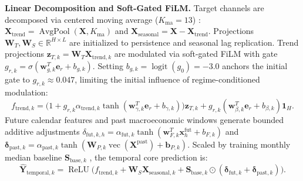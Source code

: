\documentclass[sigconf]{acmart}
\begin{document}
\textbf{Linear Decomposition and Soft-Gated FiLM.} Target channels are decomposed via centered moving average ($K_{\text{ma}}=13$) \cite{zeng2023dlinear}: $\mathbf{X}_{\text{trend}} = \operatorname{AvgPool}(\mathbf{X}, K_{\text{ma}})$ and $\mathbf{X}_{\text{seasonal}} = \mathbf{X} - \mathbf{X}_{\text{trend}}$. Projections $\mathbf{W}_T, \mathbf{W}_S \in \mathbb{R}^{H\times L}$ are initialized to persistence and seasonal lag replication. Trend projections $\mathbf{z}_{T,k}=\mathbf{W}_T\mathbf{X}_{\text{trend},k}$ are modulated via soft-gated FiLM \cite{perez2018film} with gate $g_{r,k}=\sigma(\mathbf{w}_{g,k}^T\mathbf{e}_r+b_{g,k})$. Setting $b_{g,k} = \operatorname{logit}(g_0) = -3.0$ anchors the initial gate to $g_{r,k} \approx 0.047$, limiting the initial influence of regime-conditioned modulation:
\begin{equation}
f_{\text{trend}, k} = \big(1 + g_{r,k} \alpha_{\text{trend}, k} \tanh(\mathbf{w}_{\gamma, k}^T \mathbf{e}_r + b_{\gamma, k})\big) \mathbf{z}_{T,k} + g_{r,k} (\mathbf{w}_{\beta, k}^T \mathbf{e}_r + b_{\beta, k})\mathbf{1}_H.
\label{eq:film_trend}
\end{equation}
Future calendar features and past macroeconomic windows generate bounded additive adjustments $\delta_{\text{fut}, k, h} = \alpha_{\text{fut}, k} \tanh(\mathbf{w}_{F, k}^T \mathbf{x}^{\text{fut}}_h + b_{F, k})$ and $\boldsymbol{\delta}_{\text{past}, k} = \alpha_{\text{past}, k} \tanh(\mathbf{W}_{P, k} \operatorname{vec}(\mathbf{X}^{\text{past}}) + \mathbf{b}_{P, k})$. Scaled by training monthly median baseline $\mathbf{S}_{\text{base}, k}$ \cite{hastie1990gam}, the temporal core prediction is:
\begin{equation}
\hat{\mathbf{Y}}_{\text{temporal}, k} = \operatorname{ReLU}\Big(f_{\text{trend}, k} + \mathbf{W}_S \mathbf{X}_{\text{seasonal}, k} + \mathbf{S}_{\text{base}, k} \odot (\boldsymbol{\delta}_{\text{fut}, k} + \boldsymbol{\delta}_{\text{past}, k})\Big).
\label{eq:temporal_forecast}
\end{equation}
\end{document}

